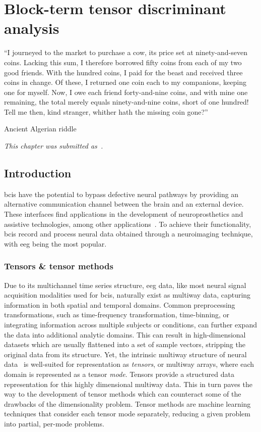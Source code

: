 
\chapter{Block-term tensor discriminant analysis}
\label{sec:bttda}

\epigraph{%
  ``I journeyed to the market to purchase a cow, its price set at ninety-and-seven coins.
  Lacking this sum, I therefore borrowed fifty coins from each of my two good friends.
  With the hundred coins, I paid for the beast and received three coins in change.
  Of these, I returned one coin each to my companions, keeping one for myself.
  Now, I owe each friend forty-and-nine coins, and with mine one remaining, the
  total merely equals ninety-and-nine coins, short of one hundred!
  Tell me then, kind stranger, whither hath the missing coin gone?''
}{%
  Ancient Algerian riddle
}
\noindent\emph{This chapter was submitted as~\textcite{VanDenKerchove2024a}.}

\section{Introduction}

\Acp{bci} have the potential to bypass
defective neural pathways by providing an alternative communication channel
between the brain and an external device.
These interfaces find applications in the development of neuroprosthetics and assistive
technologies, among other applications~\cite{Wolpaw2020}.
To achieve their functionality, \acp{bci} record and process neural data obtained through
a neuroimaging technique, with \ac{eeg} being the most popular.

\subsection{Tensors \& tensor methods}

Due to its multichannel time series structure, \ac{eeg} data, like most neural
signal acquisition modalities used for \acp{bci}, naturally exist as multiway data,
capturing information in both spatial and temporal domains.
Common preprocessing transformations, such as time-frequency transformation,
time-binning, or integrating information across multiple subjects or conditions,
can further expand the data into additional analytic domains.
This can result in high-dimensional datasets which are usually flattened into a
set of sample vectors, stripping the original data from its structure.
Yet, the intrinsic multiway structure of neural data~\cite{Erol2022} is
well-suited for representation as \emph{tensors}, or multiway arrays, where
each domain is represented as a tensor \emph{mode}.
Tensors provide a structured data representation for this highly dimensional
multiway data.
This in turn paves the way to the development of tensor methods which can
counteract some of the drawbacks of the dimensionality problem.
Tensor methods are machine learning techniques that consider each tensor mode
separately, reducing a given problem into partial, per-mode problems.

